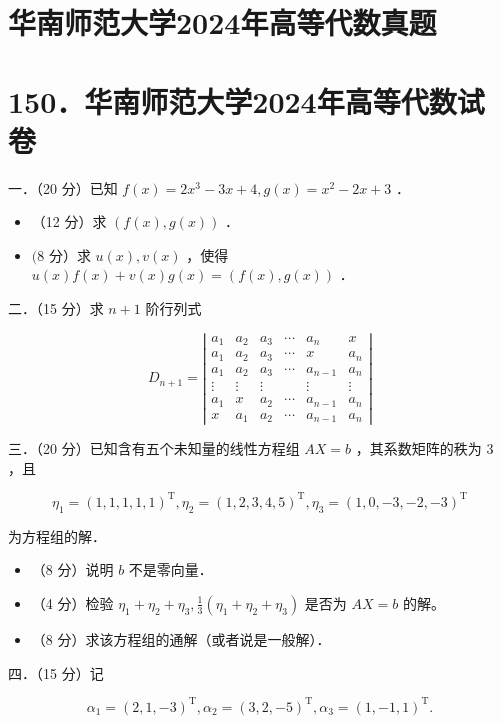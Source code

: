 \documentclass{article}
\begin{document}
\section*{华南师范大学2024年高等代数真题}
\section*{150．华南师范大学2024年高等代数试卷}
一．（20 分）已知 \(f(x)=2 x^{3}-3 x+4, g(x)=x^{2}-2 x+3\) ．

\begin{itemize}
  \item[（1）] （12 分）求 \((f(x), g(x))\) ．
  \item[（2）] \((8\) 分）求 \(u(x), v(x)\) ，使得 \(u(x) f(x)+v(x) g(x)=(f(x), g(x))\) ．
\end{itemize}

二．（15 分）求 \(n+1\) 阶行列式

\[
D_{n+1}=\left|\begin{array}{cccccc}
a_{1} & a_{2} & a_{3} & \cdots & a_{n} & x \\
a_{1} & a_{2} & a_{3} & \cdots & x & a_{n} \\
a_{1} & a_{2} & a_{3} & \cdots & a_{n-1} & a_{n} \\
\vdots & \vdots & \vdots & & \vdots & \vdots \\
a_{1} & x & a_{2} & \cdots & a_{n-1} & a_{n} \\
x & a_{1} & a_{2} & \cdots & a_{n-1} & a_{n}
\end{array}\right|
\]

三．（20 分）已知含有五个未知量的线性方程组 \(A X=b\) ，其系数矩阵的秩为 3 ，且

\[
\eta_{1}=(1,1,1,1,1)^{\mathrm{T}}, \eta_{2}=(1,2,3,4,5)^{\mathrm{T}}, \eta_{3}=(1,0,-3,-2,-3)^{\mathrm{T}}
\]

为方程组的解．

\begin{itemize}
  \item[（1）] （8 分）说明 \(b\) 不是零向量．
  \item[（2）] （4 分）检验 \(\eta_{1}+\eta_{2}+\eta_{3}, \frac{1}{3}\left(\eta_{1}+\eta_{2}+\eta_{3}\right)\) 是否为 \(A X=b\) 的解。
  \item[（3）] （8 分）求该方程组的通解（或者说是一般解）．
\end{itemize}

四．（15 分）记

\[
\alpha_{1}=(2,1,-3)^{\mathrm{T}}, \alpha_{2}=(3,2,-5)^{\mathrm{T}}, \alpha_{3}=(1,-1,1)^{\mathrm{T}} .
\]
\end{document}
